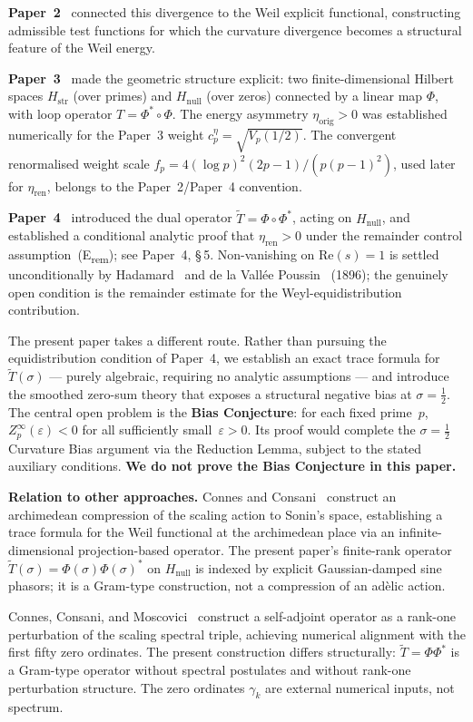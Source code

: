 \documentclass[11pt]{article}
\newcommand{\Hstr}{H_{\mathrm{str}}}
\newcommand{\Hnull}{H_{\mathrm{null}}}
\newcommand{\etaorig}{\eta_{\mathrm{orig}}}
\newcommand{\etaren}{\eta_{\mathrm{ren}}}
\newcommand{\Tt}{\widetilde{T}}
\begin{document}
\textbf{Paper~2}~\cite{Paper2} connected this divergence to the Weil
explicit functional, constructing admissible test functions
for which the curvature divergence becomes a structural feature of
the Weil energy.

\textbf{Paper~3}~\cite{Paper3} made the geometric structure explicit:
two finite-dimensional Hilbert spaces $\Hstr$ (over primes) and
$\Hnull$ (over zeros) connected by a linear map $\Phi$, with loop
operator $T=\Phi^*\circ\Phi$.
The energy asymmetry $\etaorig>0$ was established numerically for
the Paper~3 weight $c_p^\eta=\sqrt{V_p(1/2)}$.
The convergent renormalised weight scale
$f_p=4(\log p)^2(2p-1)/(p(p-1)^2)$, used later for $\etaren$,
belongs to the Paper~2/Paper~4 convention.

\textbf{Paper~4}~\cite{Paper4} introduced the dual operator
$\Tt=\Phi\circ\Phi^*$, acting on $\Hnull$, and established a
conditional analytic proof that $\etaren>0$ under the remainder
control assumption~(E\textsubscript{rem}); see Paper~4, \S\,5.
Non-vanishing on $\mathrm{Re}(s)=1$ is settled unconditionally by
Hadamard~\cite{Hadamard} and de la Vall\'ee Poussin~\cite{dlVP}
(1896); the genuinely open
condition is the remainder estimate for the Weyl-equidistribution
contribution.

The present paper takes a different route.
Rather than pursuing the equidistribution condition of Paper~4,
we establish an exact trace formula for $\Tt(\sigma)$ --- purely
algebraic, requiring no analytic assumptions --- and introduce
the smoothed zero-sum theory that exposes a structural negative
bias at $\sigma=\tfrac{1}{2}$.
The central open problem is the \textbf{Bias Conjecture}:
for each fixed prime~$p$,
$Z_p^\infty(\varepsilon)<0$
for all sufficiently small~$\varepsilon>0$.
Its proof would complete the $\sigma=\tfrac{1}{2}$ Curvature Bias
argument via the Reduction Lemma, subject to the stated auxiliary
conditions.
\textbf{We do not prove the Bias Conjecture in this paper.}

\textbf{Relation to other approaches.}
Connes and Consani~\cite{ConnesConsani21} construct an archimedean
compression of the scaling action to Sonin's space, establishing a
trace formula for the Weil functional at the archimedean place via an
infinite-dimensional projection-based operator.
The present paper's finite-rank operator
$\Tt(\sigma)=\Phi(\sigma)\Phi(\sigma)^*$ on $\Hnull$ is indexed by
explicit Gaussian-damped sine phasors; it is a Gram-type construction,
not a compression of an ad\`elic action.

Connes, Consani, and Moscovici~\cite{CCM25} construct a self-adjoint
operator as a rank-one perturbation of the scaling spectral triple,
achieving numerical alignment with the first fifty zero ordinates.
The present construction differs structurally: $\Tt=\Phi\Phi^*$ is
a Gram-type operator without spectral postulates and without rank-one
perturbation structure. The zero ordinates $\gamma_k$ are external
numerical inputs, not spectrum.
\end{document}
